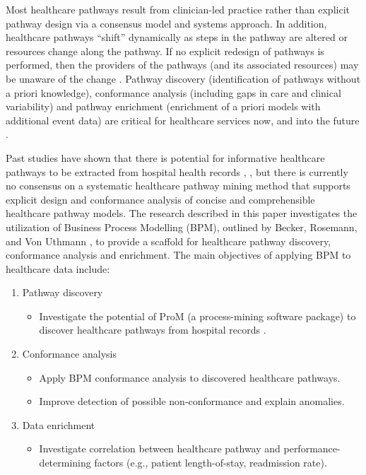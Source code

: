 \documentclass{elsarticle}
\begin{document}
Most healthcare pathways result from clinician-led practice rather than explicit pathway design via a consensus model and systems approach. In addition, healthcare pathways “shift” dynamically as steps in the pathway are altered or resources change along the pathway. If no explicit redesign of pathways is performed, then the providers of the pathways (and its associated resources) may be unaware of the change \cite{Zhang2015}. Pathway discovery (identification of pathways without a priori knowledge), conformance analysis (including gaps in care and clinical variability) and pathway enrichment (enrichment of a priori models with additional event data) are critical for healthcare services now, and into the future \cite{Baker2017}.

Past studies have shown that there is potential for informative healthcare pathways to be extracted from hospital health records \cite{Xu2017}, \cite{Iwata2013}, but there is currently no consensus on a systematic healthcare pathway mining method that supports explicit design and conformance analysis of concise and comprehensible healthcare pathway models. The research described in this paper investigates the utilization of Business Process Modelling (BPM), outlined by Becker, Rosemann, and Von Uthmann \cite{Becker2000}, to provide a scaffold for healthcare pathway discovery, conformance analysis and enrichment. The main objectives of applying BPM to healthcare data include:
\begin{enumerate}
    \item Pathway discovery
    \begin{itemize}
        \item Investigate the potential of ProM (a process-mining software package) to discover healthcare pathways from hospital records \cite{VanDongen2005}.
    \end{itemize}
    \item Conformance analysis
    \begin{itemize}
        \item Apply BPM conformance analysis to discovered healthcare pathways. 
        \item Improve detection of possible non-conformance and explain anomalies.
    \end{itemize}
    \item Data enrichment
    \begin{itemize}
        \item Investigate correlation between healthcare pathway and performance-determining factors (e.g., patient length-of-stay, readmission rate).
    \end{itemize}
\end{enumerate}
\end{document}
